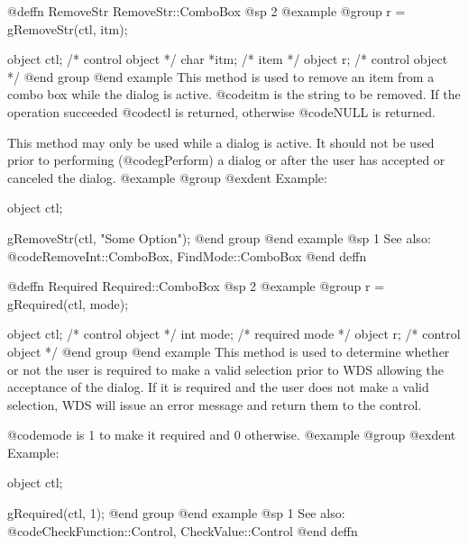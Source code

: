 @deffn {RemoveStr} RemoveStr::ComboBox
@sp 2
@example
@group
r = gRemoveStr(ctl, itm);

object  ctl;    /*  control object  */
char   *itm;    /*  item            */
object  r;      /*  control object  */
@end group
@end example
This method is used to remove an item from a combo box while the dialog
is active.  @code{itm} is the string to be removed.
If the operation succeeded @code{ctl} is returned, otherwise @code{NULL}
is returned.

This method may only be used while a dialog is active.  It should not be
used prior to performing (@code{gPerform}) a dialog or after the user
has accepted or canceled the dialog.
@example
@group
@exdent Example:

object  ctl;

gRemoveStr(ctl, "Some Option");
@end group
@end example
@sp 1
See also:  @code{RemoveInt::ComboBox, FindMode::ComboBox}
@end deffn

















@deffn {Required} Required::ComboBox
@sp 2
@example
@group
r = gRequired(ctl, mode);

object  ctl;    /*  control object  */
int     mode;   /*  required mode   */
object  r;      /*  control object  */
@end group
@end example
This method is used to determine whether or not the user is required to
make a valid selection prior to WDS allowing the acceptance of the dialog.
If it is required and the user does not make a valid selection, WDS
will issue an error message and return them to the control.

@code{mode} is 1 to make it required and 0 otherwise.
@example
@group
@exdent Example:

object  ctl;

gRequired(ctl, 1);
@end group
@end example
@sp 1
See also:  @code{CheckFunction::Control, CheckValue::Control}
@end deffn



















